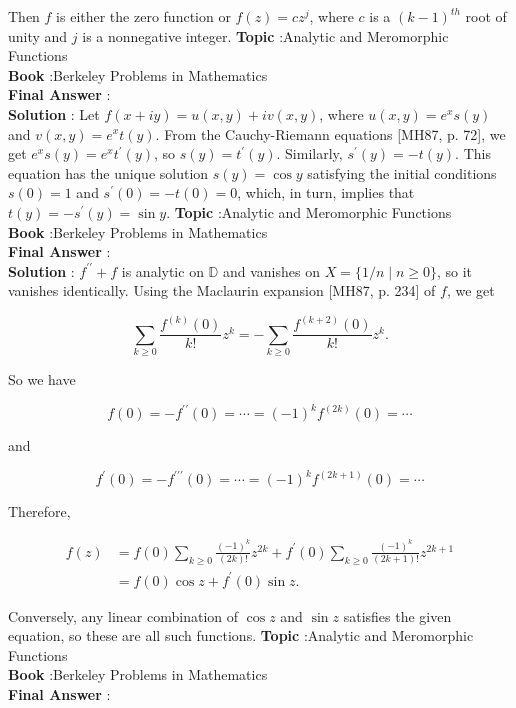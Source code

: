 \documentclass[10pt]{article}
\begin{document}
Then $f$ is either the zero function or $f(z)=c z^{j}$, where $c$ is a $(k-1)^{t h}$ root of unity and $j$ is a nonnegative integer.
\textbf{Topic} :Analytic and Meromorphic Functions \\
\textbf{Book} :Berkeley Problems in Mathematics\\
\textbf{Final Answer} :\\


\textbf{Solution} : Let $f(x+i y)=u(x, y)+i v(x, y)$, where $u(x, y)=e^{x} s(y)$ and $v(x, y)=e^{x} t(y)$. From the Cauchy-Riemann equations [MH87, p. 72], we get $e^{x} s(y)=e^{x} t^{\prime}(y)$, so $s(y)=t^{\prime}(y)$. Similarly, $s^{\prime}(y)=-t(y)$. This equation has the unique solution $s(y)=\cos y$ satisfying the initial conditions $s(0)=1$ and $s^{\prime}(0)=-t(0)=0$, which, in turn, implies that $t(y)=-s^{\prime}(y)=\sin y$.
\textbf{Topic} :Analytic and Meromorphic Functions \\
\textbf{Book} :Berkeley Problems in Mathematics\\
\textbf{Final Answer} :\\


\textbf{Solution} : $f^{\prime \prime}+f$ is analytic on $\mathbb{D}$ and vanishes on $X=\{1 / n \mid n \geqslant 0\}$, so it vanishes identically. Using the Maclaurin expansion [MH87, p. 234] of $f$, we get

$$
\sum_{k \geqslant 0} \frac{f^{(k)}(0)}{k !} z^{k}=-\sum_{k \geqslant 0} \frac{f^{(k+2)}(0)}{k !} z^{k} .
$$

So we have

$$
f(0)=-f^{\prime \prime}(0)=\cdots=(-1)^{k} f^{(2 k)}(0)=\cdots
$$

and

$$
f^{\prime}(0)=-f^{\prime \prime \prime}(0)=\cdots=(-1)^{k} f^{(2 k+1)}(0)=\cdots
$$

Therefore,

$$
\begin{aligned}
f(z) &=f(0) \sum_{k \geqslant 0} \frac{(-1)^{k}}{(2 k) !} z^{2 k}+f^{\prime}(0) \sum_{k \geqslant 0} \frac{(-1)^{k}}{(2 k+1) !} z^{2 k+1} \\
&=f(0) \cos z+f^{\prime}(0) \sin z .
\end{aligned}
$$

Conversely, any linear combination of $\cos z$ and $\sin z$ satisfies the given equation, so these are all such functions.
\textbf{Topic} :Analytic and Meromorphic Functions \\
\textbf{Book} :Berkeley Problems in Mathematics\\
\textbf{Final Answer} :\\
\end{document}
